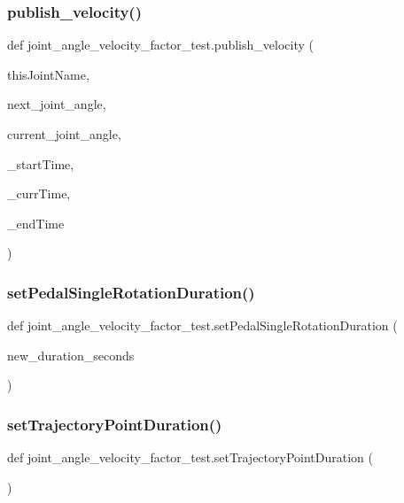 \subsubsection{\texorpdfstring{publish\_velocity()}{publish\_velocity()}}
{\footnotesize\ttfamily def joint\+\_\+angle\+\_\+velocity\+\_\+factor\+\_\+test.\+publish\+\_\+velocity (\begin{DoxyParamCaption}\item[{}]{this\+Joint\+Name,  }\item[{}]{next\+\_\+joint\+\_\+angle,  }\item[{}]{current\+\_\+joint\+\_\+angle,  }\item[{}]{\+\_\+start\+Time,  }\item[{}]{\+\_\+curr\+Time,  }\item[{}]{\+\_\+end\+Time }\end{DoxyParamCaption})}

\mbox{\label{namespacejoint__angle__velocity__factor__test_a4b7edc3596e3eab9bedf14e023ccd75b}} 
\subsubsection{\texorpdfstring{setPedalSingleRotationDuration()}{setPedalSingleRotationDuration()}}
{\footnotesize\ttfamily def joint\+\_\+angle\+\_\+velocity\+\_\+factor\+\_\+test.\+set\+Pedal\+Single\+Rotation\+Duration (\begin{DoxyParamCaption}\item[{}]{new\+\_\+duration\+\_\+seconds }\end{DoxyParamCaption})}

\mbox{\label{namespacejoint__angle__velocity__factor__test_a8ccd55a57db9549655bb635bb0631dff}} 
\subsubsection{\texorpdfstring{setTrajectoryPointDuration()}{setTrajectoryPointDuration()}}
{\footnotesize\ttfamily def joint\+\_\+angle\+\_\+velocity\+\_\+factor\+\_\+test.\+set\+Trajectory\+Point\+Duration (\begin{DoxyParamCaption}{ }\end{DoxyParamCaption})}



